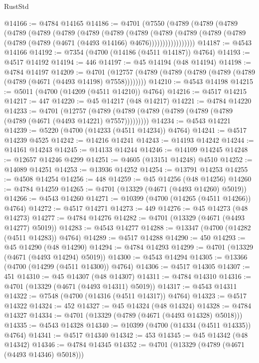 \begin{lexlean}{RustStd}
\begin{coremodule}
@14166 := @4784 @14165
@14186 := @4701
    (@7550
      (@4789
        (@4789
          (@4789
            (@4789
              (@4789
                (@4789
                  (@4789
                    (@4789
                      (@4789
                        (@4789
                          (@4789
                            (@4789 (@4789 (@4789 (@4789 (@4671 (@4493 @14166) @4676)))))))))))))))))
@14187 := @4543 @14166
@14192 := @7354 (@4700 (@14186 (@4511 @14187)) @4764)
@14193 := @4517 @14192
@14194 := 446
@14197 := @45 @14194 (@48 @14194)
@14198 := @4784 @14197
@14209 := @4701
    (@12757 (@4789 (@4789 (@4789 (@4789 (@4789 (@4789 (@4671 (@4493 @14198) @7558))))))))
@14210 := @4543 @14198
@14215 := @5011 (@4700 (@14209 (@4511 @14210)) @4764)
@14216 := @4517 @14215
@14217 := 447
@14220 := @45 @14217 (@48 @14217)
@14221 := @4784 @14220
@14233 := @4701
    (@12757 (@4789 (@4789 (@4789 (@4789 (@4789 (@4789 (@4789 (@4671 (@4493 @14221) @7557)))))))))
@14234 := @4543 @14221
@14239 := @5220 (@4700 (@14233 (@4511 @14234)) @4764)
@14241 := @4517 @14239 @4525
@14242 := @14216 @14241
@14243 := @14193 @14242
@14244 := @14161 @14243
@14245 := @14133 @14244
@14246 := @14109 @14245
@14248 := @12657 @14246 @4299
@14251 := @4605 (@13151 @14248) @4510
@14252 := @14089 @14251
@14253 := @13936 @14252
@14254 := @13791 @14253
@14255 := @4508 @14254
@14256 := 448
@14259 := @45 @14256 (@48 @14256)
@14260 := @4784 @14259
@14265 := @4701 (@13329 (@4671 (@4493 @14260) @5019))
@14266 := @4543 @14260
@14271 := @10399 (@4700 (@14265 (@4511 @14266)) @4764)
@14272 := @4517 @14271
@14273 := 449
@14276 := @45 @14273 (@48 @14273)
@14277 := @4784 @14276
@14282 := @4701 (@13329 (@4671 (@4493 @14277) @5019))
@14283 := @4543 @14277
@14288 := @13347 (@4700 (@14282 (@4511 @14283)) @4764)
@14289 := @4517 @14288
@14290 := 450
@14293 := @45 @14290 (@48 @14290)
@14294 := @4784 @14293
@14299 := @4701 (@13329 (@4671 (@4493 @14294) @5019))
@14300 := @4543 @14294
@14305 := @13366 (@4700 (@14299 (@4511 @14300)) @4764)
@14306 := @4517 @14305
@14307 := 451
@14310 := @45 @14307 (@48 @14307)
@14311 := @4784 @14310
@14316 := @4701 (@13329 (@4671 (@4493 @14311) @5019))
@14317 := @4543 @14311
@14322 := @7548 (@4700 (@14316 (@4511 @14317)) @4764)
@14323 := @4517 @14322
@14324 := 452
@14327 := @45 @14324 (@48 @14324)
@14328 := @4784 @14327
@14334 := @4701 (@13329 (@4789 (@4671 (@4493 @14328) @5018)))
@14335 := @4543 @14328
@14340 := @10399 (@4700 (@14334 (@4511 @14335)) @4764)
@14341 := @4517 @14340
@14342 := 453
@14345 := @45 @14342 (@48 @14342)
@14346 := @4784 @14345
@14352 := @4701 (@13329 (@4789 (@4671 (@4493 @14346) @5018)))

\end{coremodule}
\end{lexlean}
